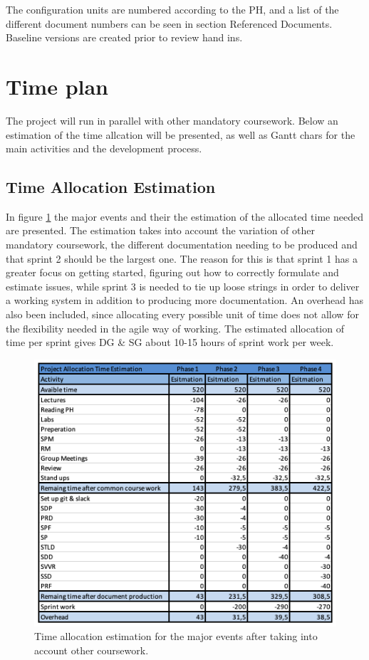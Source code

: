 \documentclass{article}
\begin{document}
The configuration units are numbered according to the PH, and a list of the different document numbers can be seen in section Referenced Documents. Baseline versions are created prior to review hand ins.  

\section{Time plan}
The project will run in parallel with other mandatory coursework. Below an estimation of the time allcation will be presented, as well as Gantt chars for the main activities and the development process. 

\subsection{Time Allocation Estimation}
In figure \ref{fig:timeEst} the major events and their the estimation of the allocated time needed are presented. The estimation takes into account the variation of other mandatory coursework, the different documentation needing to be produced and that sprint 2 should be the largest one. The reason for this is that sprint 1 has a greater focus on getting started, figuring out how to correctly formulate and estimate issues, while sprint 3 is needed to tie up loose strings in order to deliver a working system in addition to producing more documentation. An overhead has also been included, since allocating every possible unit of time does not allow for the flexibility needed in the agile way of working. The estimated allocation of time per sprint gives DG \& SG about 10-15 hours of sprint work per week. 
\begin{figure}[H]
    \centering
    \includegraphics[scale=0.8]{sdpFigures/TimeEst.png}
    \caption{Time allocation estimation for the major events after taking into account other coursework.}
    \label{fig:timeEst}
\end{figure}
\end{document}
